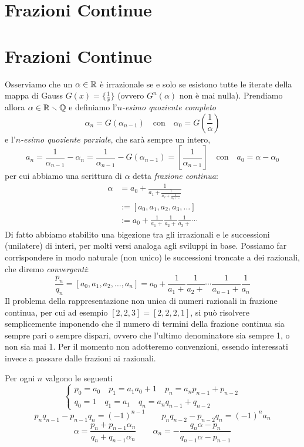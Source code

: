 \section{Frazioni Continue}

\section{Frazioni Continue}

Osserviamo che un $\alpha\in\mathbb{R}$  \`e irrazionale se e solo se esistono tutte le iterate della mappa di Gauss $G(x)=\{\frac{1}{x}\}$ (ovvero $G^n(\alpha)$ non  \`e mai nulla). Prendiamo allora $\alpha\in\mathbb{R}\smallsetminus\mathbb{Q}$ e definiamo l'$n$\emph{-esimo quoziente completo}
\[\alpha_n=G(\alpha_{n-1}) \quad\mbox{con}\quad \alpha_0=G\left(\frac{1}{\alpha}\right)\]
e l'$n$\emph{-esimo quoziente parziale}, che sar\`a sempre un intero,
\[a_n=\frac{1}{\alpha_{n-1}}-\alpha_n=\frac{1}{\alpha_{n-1}}-G(\alpha_{n-1})=\left[\frac{1}{\alpha_{n-1}}\right] \quad \mbox{con} \quad a_0=\alpha-\alpha_0\]
per cui abbiamo una scrittura di $\alpha$ detta \emph{frazione continua}:
\[\begin{split}
\alpha&=a_0+\frac{1}{a_1+\frac{1}{a_2+\frac{1}{a_3+\dots}}}\\
      &:=[a_0,a_1,a_2,a_3,\dots]\\
      &:=a_0+\frac{1}{a_1+}\frac{1}{a_2+}\frac{1}{a_3+}\cdots
\end{split}\]
Di fatto abbiamo stabilito una bigezione tra gli irrazionali e le successioni (unilatere) di interi, per molti versi analoga agli sviluppi in base. Possiamo far corrispondere in modo naturale (non unico) le successioni troncate a dei razionali, che diremo \emph{convergenti}:
\[\frac{p_n}{q_n}=[a_0,a_1,a_2,\dots,a_n]=a_0+\frac{1}{a_1+}\frac{1}{a_2+}\cdots\frac{1}{a_{n-1}+}\frac{1}{a_n}\]
Il problema della rappresentazione non unica di numeri razionali in frazione continua, per cui ad esempio $[2,2,3]=[2,2,2,1]$, si pu\`o risolvere semplicemente imponendo che il numero di termini della frazione continua sia sempre pari o sempre dispari, ovvero che l'ultimo denominatore sia sempre 1, o non sia mai 1. Per il momento non adotteremo convenzioni, essendo interessati invece a passare dalle frazioni ai razionali.

\begin{teo} Per ogni $n$ valgono le seguenti
\[\begin{cases}
   p_0=a_0 \quad p_1=a_1a_0+1 \quad p_{n}=a_np_{n-1}+p_{n-2}\\
   q_0=1 \quad q_1=a_1 \quad q_{n}=a_nq_{n-1}+q_{n-2}
  \end{cases}\]
\[p_nq_{n-1}-p_{n-1}q_n=(-1)^{n-1} \qquad p_nq_{n-2}-p_{n-2}q_n=(-1)^na_n\]
\[\alpha=\frac{p_n+p_{n-1}\alpha_n}{q_n+q_{n-1}\alpha_n} \qquad \alpha_n=-\frac{q_n\alpha-p_n}{q_{n-1}\alpha-p_{n-1}}\]
\end{teo}

